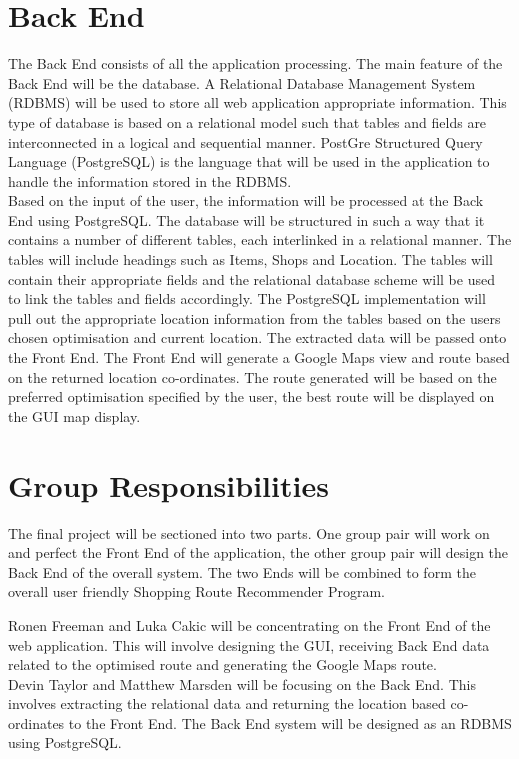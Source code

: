 \documentclass[10pt, a4paper, onecolumn]{scrartcl}
\begin{document}
	\section{Back End}
	
		The Back End consists of all the application processing. The main feature of the Back End will be the database. A Relational Database Management System (RDBMS) will be used to store all web application appropriate information. This type of database is based on a relational model such that tables and fields are interconnected in a logical and sequential manner. PostGre Structured Query Language (PostgreSQL) is the language that will be used in the application to handle the information stored in the RDBMS. \\
	
		Based on the input of the user, the information will be processed at the Back End using PostgreSQL. The database will be structured in such a way that it contains a number of different tables, each interlinked in a relational manner. The tables will include headings such as Items, Shops and Location. The tables will contain their appropriate fields and the relational database scheme will be used to link the tables and fields accordingly. The PostgreSQL implementation will pull out the appropriate location information from the tables based on the users chosen optimisation and current location. The extracted data will be passed onto the Front End. The Front End will generate a Google Maps view and route based on the returned location co-ordinates. The route generated will be based on the preferred optimisation specified by the user, the best route will be displayed on the GUI map display. 
	
	\section{Group Responsibilities}
	
		The final project will be sectioned into two parts. One group pair will work on and perfect the Front End of the application, the other group pair will design the Back End of the overall system. The two Ends will be combined to form the overall user friendly Shopping Route Recommender Program. 
		
		Ronen Freeman and Luka Cakic will be concentrating on the Front End of the web application. This will involve designing the GUI, receiving Back End data related to the optimised route and generating the Google Maps route. \\
		
		Devin Taylor and Matthew Marsden will be focusing on the Back End. This involves extracting the relational data  and returning the location based co-ordinates to the Front End. The Back End system will be designed as an RDBMS using PostgreSQL.   
	

	
		
		
\end{document}
